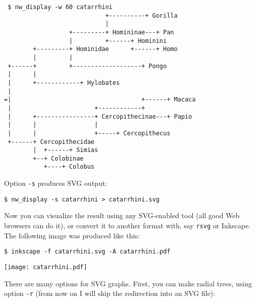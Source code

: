 \documentclass[a4paper,10pt]{report}
\newcommand{\svg}{\textsc{SVG}}
\begin{document}
\begin{samepage}
\begin{verbatim}
 $ nw_display -w 60 catarrhini
                            +----------+ Gorilla            
                            |                               
                  +---------+ Homininae---+ Pan             
                  |         +------+ Hominini               
        +---------+ Hominidae      +------+ Homo            
        |         |                                         
 +------+         +-------------------+ Pongo               
 |      |                                                   
 |      +------------+ Hylobates                            
 |                                                          
=|                                    +------+ Macaca       
 |                       +------------+                     
 |      +----------------+ Cercopithecinae---+ Papio        
 |      |                |                                  
 |      |                +-----+ Cercopithecus              
 +------+ Cercopithecidae                                   
        |  +------+ Simias                                  
        +--+ Colobinae                                      
           +----+ Colobus   
\end{verbatim}
\end{samepage}

Option \texttt{-s} produces \svg{} output:

\begin{verbatim}
$ nw_display -s catarrhini > catarrhini.svg
\end{verbatim}

Now you can visualize the result using any \svg-enabled tool (all good Web browsers can do it), or convert it to another format with, say \texttt{rsvg} or Inkscape. The following image was produced like this:

\begin{verbatim}
$ inkscape -f catarrhini.svg -A catarrhini.pdf
\end{verbatim}

\begin{center}
 \texttt{[image: catarrhini.pdf]}
\end{center}

There are many options for \svg{} graphs. First, you can make radial trees, using option \texttt{-r} (from now on I will skip the redirection into an \svg{} file):
\end{document}
